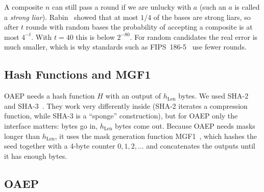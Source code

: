 \documentclass[runningheads]{llncs}
\newcommand{\hlen}{h_{\mathrm{Len}}}
\begin{document}
A composite $n$ can still pass a round if we are unlucky with $a$ (such an
$a$ is called a \emph{strong liar}). Rabin~\cite{rabin1980} showed that at
most $1/4$ of the bases are strong liars, so after $t$ rounds with random
bases the probability of accepting a composite is at most $4^{-t}$. With
$t = 40$ this is below $2^{-80}$. For random candidates the real error is
much smaller, which is why standards such as FIPS~186-5~\cite{fips1865} use
fewer rounds.

\subsection{Hash Functions and MGF1}

OAEP needs a hash function $H$ with an output of $\hlen$ bytes. We used
SHA-2~\cite{fips1804} and SHA-3~\cite{fips202}. They work very differently
inside (SHA-2 iterates a compression function, while SHA-3 is a ``sponge''
construction), but for OAEP only the interface matters: bytes go in, $\hlen$
bytes come out. Because OAEP needs masks longer than $\hlen$, it uses the mask
generation function MGF1~\cite{rfc8017}, which hashes the seed together with
a 4-byte counter $0, 1, 2, \dots$ and concatenates the outputs until it has
enough bytes.

\subsection{OAEP}
\end{document}
